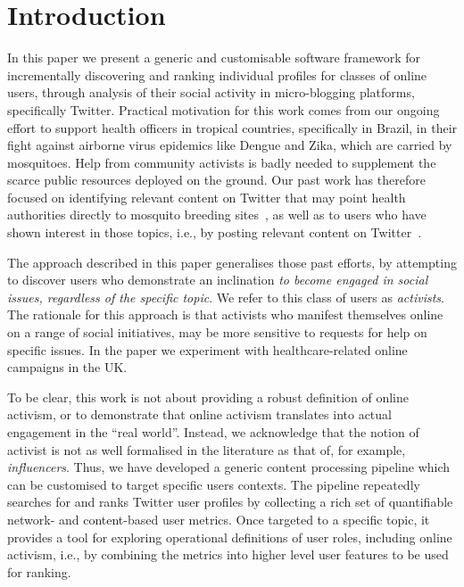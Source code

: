 \documentclass[runningheads]{llncs}
\begin{document}
\section{Introduction}

In this paper we present a generic and customisable software framework for incrementally discovering and ranking individual profiles for classes of online users, through analysis of their social activity in micro-blogging platforms, specifically Twitter.
Practical motivation for this work comes from our ongoing effort to support health officers in tropical countries, specifically in Brazil, in their fight against airborne virus epidemics like Dengue and Zika, which are carried by mosquitoes. Help from community activists is badly needed to supplement the scarce public resources deployed on the ground. Our past work has therefore focused on identifying relevant content on Twitter that may point health authorities directly to mosquito breeding sites~\cite{Sousa2018}, as well as to users who have shown interest in those topics, i.e., by posting relevant content on Twitter~\cite{Missier2017}. 

The approach described in this paper generalises those past efforts, by attempting to discover users who demonstrate an inclination \textit{to become engaged in social issues, regardless of the specific topic}.
We refer to this class of users as \textit{activists}.
The rationale for this approach is that activists who manifest themselves online on a range of social initiatives, may be more sensitive to requests for help on specific issues. 
In the paper we experiment with healthcare-related online campaigns in the UK.

To be clear, this work is not about providing a robust definition of online activism, or to demonstrate that online activism translates into actual engagement in the ``real world''.
%
Instead, we acknowledge that the notion of activist is not as well formalised in the literature as that of, for example, \textit{influencers}. 
Thus, we have developed a generic content processing pipeline which can be customised to target specific users contexts. 
The pipeline repeatedly searches for and ranks Twitter user profiles by collecting a rich set of quantifiable network- and content-based user metrics. 
Once targeted to a specific topic, it provides a tool for exploring operational definitions of user roles, including online activism, i.e., by combining the metrics into higher level user features to be used for ranking.
\end{document}
